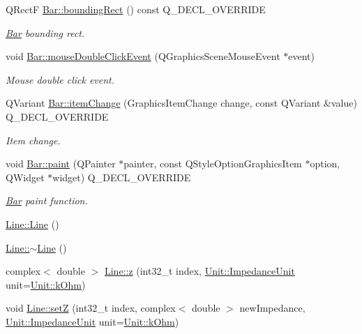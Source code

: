 \begin{DoxyCompactItemize}
Q\+Rect\+F \hyperlink{group___models_ga8279d8109019cc7e139e2023690496be}{Bar\+::bounding\+Rect} () const Q\+\_\+\+D\+E\+C\+L\+\_\+\+O\+V\+E\+R\+R\+I\+D\+E
\begin{DoxyCompactList}\small\item\em \hyperlink{class_bar}{Bar} bounding rect. \end{DoxyCompactList}\item 
void \hyperlink{group___models_ga1945e7b4401fa9ad7475274d9fb12a72}{Bar\+::mouse\+Double\+Click\+Event} (Q\+Graphics\+Scene\+Mouse\+Event $\ast$event)
\begin{DoxyCompactList}\small\item\em Mouse double click event. \end{DoxyCompactList}\item 
Q\+Variant \hyperlink{group___models_gad97a82d618ee0c51a9a36e44339c69e6}{Bar\+::item\+Change} (Graphics\+Item\+Change change, const Q\+Variant \&value) Q\+\_\+\+D\+E\+C\+L\+\_\+\+O\+V\+E\+R\+R\+I\+D\+E
\begin{DoxyCompactList}\small\item\em Item change. \end{DoxyCompactList}\item 
void \hyperlink{group___models_gacbb6dbac607412c9c1f9dfcd0cd4d432}{Bar\+::paint} (Q\+Painter $\ast$painter, const Q\+Style\+Option\+Graphics\+Item $\ast$option, Q\+Widget $\ast$widget) Q\+\_\+\+D\+E\+C\+L\+\_\+\+O\+V\+E\+R\+R\+I\+D\+E
\begin{DoxyCompactList}\small\item\em \hyperlink{class_bar}{Bar} paint function. \end{DoxyCompactList}\item 
\hyperlink{group___models_gacc11b8a429d8cdd63ba6803dff5602b3}{Line\+::\+Line} ()
\item 
\hyperlink{group___models_gaabe85f48d22d92b62257091f48174fac}{Line\+::$\sim$\+Line} ()
\item 
complex$<$ double $>$ \hyperlink{group___models_gab5370574fd93e13eb11742f7753fe1f1}{Line\+::z} (int32\+\_\+t index, \hyperlink{class_unit_a3747e779c805df24a71961290be3fbdf}{Unit\+::\+Impedance\+Unit} unit=\hyperlink{class_unit_a3747e779c805df24a71961290be3fbdfa6b9c74d1763eefbaf751eeecff0bd9da}{Unit\+::k\+Ohm})
\item 
void \hyperlink{group___models_ga409df7d11f5c5d594a13fb2f74b3b9e0}{Line\+::set\+Z} (int32\+\_\+t index, complex$<$ double $>$ new\+Impedance, \hyperlink{class_unit_a3747e779c805df24a71961290be3fbdf}{Unit\+::\+Impedance\+Unit} unit=\hyperlink{class_unit_a3747e779c805df24a71961290be3fbdfa6b9c74d1763eefbaf751eeecff0bd9da}{Unit\+::k\+Ohm})

\end{DoxyCompactItemize}
